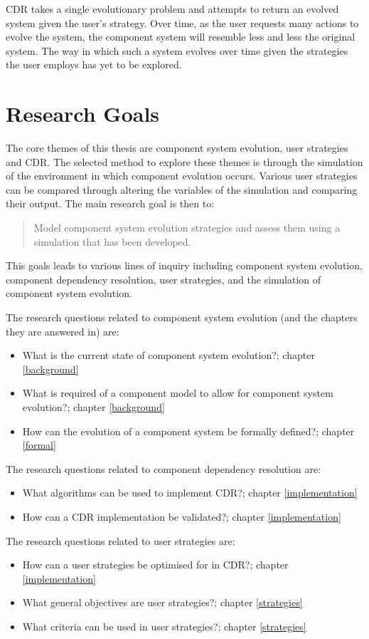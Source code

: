 CDR takes a single evolutionary problem and attempts to return an evolved system given the user's strategy.
Over time, as the user requests many actions to evolve the system, the component system will resemble less and less the original system.
The way in which such a system evolves over time given the strategies the user employs has yet to be explored. 

\section{Research Goals}
The core themes of this thesis are component system evolution, user strategies and CDR.
The selected method to explore these themes is through the simulation of the environment in which component evolution occurs.
Various user strategies can be compared through altering the variables of the simulation and comparing their output.
The main research goal is then to:
\begin{quote}
Model component system evolution strategies and assess them using a simulation that has been developed.
\end{quote}

This goals leads to various lines of inquiry including component system evolution, component dependency resolution, user strategies, and the simulation of component system evolution.

The research questions related to component system evolution (and the chapters they are answered in) are:
\begin{itemize}
	\item What is the current state of component system evolution?; chapter \ref{background}
	\item What is required of a component model to allow for component system evolution?; chapter \ref{background}
	\item How can the evolution of a component system be formally defined?; chapter \ref{formal}
\end{itemize}

The research questions related to component dependency resolution are:
\begin{itemize}
  \item What algorithms can be used to implement CDR?; chapter \ref{implementation}
  \item How can a CDR implementation be validated?; chapter \ref{implementation}
\end{itemize}

The research questions related to user strategies are: 
\begin{itemize}
	\item How can a user strategies be optimised for in CDR?; chapter \ref{implementation}
	\item What general objectives are user strategies?;  chapter \ref{strategies}
	\item What criteria can be used in user strategies?; chapter \ref{strategies}
\end{itemize}

